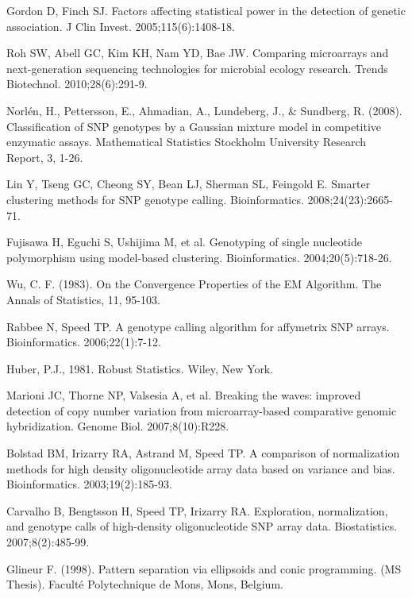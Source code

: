 \documentclass{scrartcl}
\begin{document}
\begin{thebibliography}{9}

Gordon D, Finch SJ. Factors affecting statistical power in the detection of
genetic association. J Clin Invest. 2005;115(6):1408-18.

Roh SW, Abell GC, Kim KH, Nam YD, Bae JW. Comparing microarrays and
next-generation sequencing technologies for microbial ecology research.
Trends Biotechnol. 2010;28(6):291-9.

Norl\'{e}n, H., Pettersson, E., Ahmadian, A., Lundeberg, J., \& Sundberg, R.
(2008). Classification of SNP genotypes by a Gaussian mixture model in
competitive enzymatic assays.
Mathematical Statistics Stockholm University Research Report, 3, 1-26.

Lin Y, Tseng GC, Cheong SY, Bean LJ, Sherman SL, Feingold E. Smarter
clustering methods for SNP genotype calling.
Bioinformatics. 2008;24(23):2665-71.

Fujisawa H, Eguchi S, Ushijima M, et al. Genotyping of single nucleotide
polymorphism using model-based clustering. Bioinformatics. 2004;20(5):718-26.

Wu, C. F. (1983). On the Convergence Properties of the EM Algorithm.
The Annals of Statistics, 11, 95-103.

Rabbee N, Speed TP. A genotype calling algorithm for affymetrix SNP arrays.
Bioinformatics. 2006;22(1):7-12.

Huber, P.J., 1981. Robust Statistics. Wiley, New York.

Marioni JC, Thorne NP, Valsesia A, et al. Breaking the waves: improved
detection of copy number variation from microarray-based comparative genomic
hybridization. Genome Biol. 2007;8(10):R228.

Bolstad BM, Irizarry RA, Astrand M, Speed TP. A comparison of normalization
methods for high density oligonucleotide array data based on variance and
bias. Bioinformatics. 2003;19(2):185-93.

Carvalho B, Bengtsson H, Speed TP, Irizarry RA. Exploration, normalization,
and genotype calls of high-density oligonucleotide SNP array data.
Biostatistics. 2007;8(2):485-99.

Glineur F. (1998). Pattern separation via ellipsoids and conic programming.
(MS Thesis). Faculté Polytechnique de Mons, Mons, Belgium.


\end{thebibliography}
\end{document}
